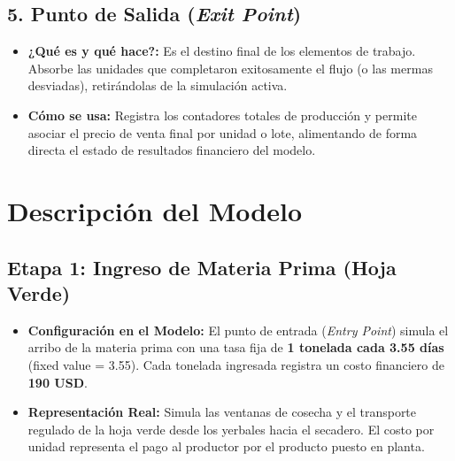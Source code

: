 \documentclass[11pt, a4paper]{article}
\begin{document}
\subsection{5. Punto de Salida (\textit{Exit Point})}
\begin{itemize}
    \item \textbf{¿Qué es y qué hace?:} Es el destino final de los elementos de trabajo. Absorbe las unidades que completaron exitosamente el flujo (o las mermas desviadas), retirándolas de la simulación activa.
    \item \textbf{Cómo se usa:} Registra los contadores totales de producción y permite asociar el precio de venta final por unidad o lote, alimentando de forma directa el estado de resultados financiero del modelo.
\end{itemize}


\section{Descripción del Modelo }



\subsection{Etapa 1: Ingreso de Materia Prima (Hoja Verde)}
\begin{itemize}
    \item \textbf{Configuración en el Modelo:} El punto de entrada (\textit{Entry Point}) simula el arribo de la materia prima con una tasa fija de \textbf{1 tonelada cada 3.55 días} (fixed value = 3.55). Cada tonelada ingresada registra un costo financiero de \textbf{190 USD}.
    \item \textbf{Representación Real:} Simula las ventanas de cosecha y el transporte regulado de la hoja verde desde los yerbales hacia el secadero. El costo por unidad representa el pago al productor por el producto puesto en planta.
\end{itemize}
\end{document}
